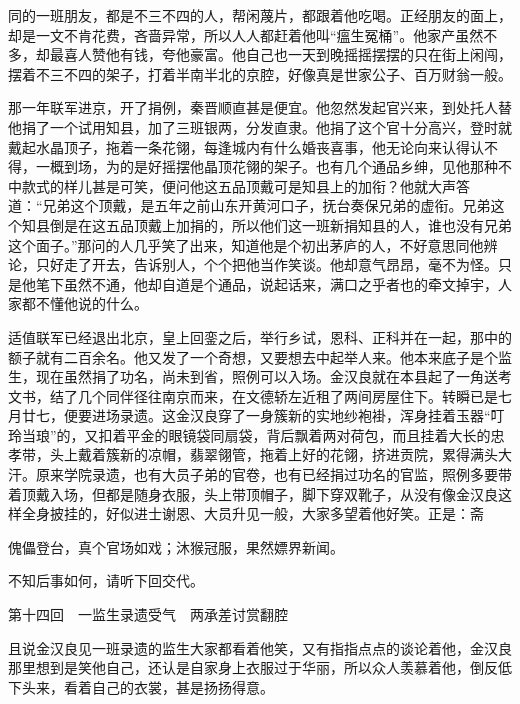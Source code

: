 \documentclass[12pt,UTF8]{ctexbook}
\begin{document}
{{{同的一班朋友，都是不三不四的人，帮闲蔑片，都跟着他吃喝。正经朋友的面上，却是一文不肯花费，吝啬异常，所以人人都赶着他叫“瘟生冤桶”。他家产虽然不多，却最喜人赞他有钱，夸他豪富。他自己也一天到晚摇摇摆摆的只在街上闲闯，摆着不三不四的架子，打着半南半北的京腔，好像真是世家公子、百万财翁一般。

那一年联军进京，开了捐例，秦晋顺直甚是便宜。他忽然发起官兴来，到处托人替他捐了一个试用知县，加了三班银两，分发直隶。他捐了这个官十分高兴，登时就戴起水晶顶子，拖着一条花翎，每逢城内有什么婚丧喜事，他无论向来认得认不得，一概到场，为的是好摇摆他晶顶花翎的架子。也有几个通品乡绅，见他那种不中款式的样儿甚是可笑，便问他这五品顶戴可是知县上的加衔？他就大声答道：“兄弟这个顶戴，是五年之前山东开黄河口子，抚台奏保兄弟的虚衔。兄弟这个知县倒是在这五品顶戴上加捐的，所以他们这一班新捐知县的人，谁也没有兄弟这个面子。”那问的人几乎笑了出来，知道他是个初出茅庐的人，不好意思同他辨论，只好走了开去，告诉别人，个个把他当作笑谈。他却意气昂昂，毫不为怪。只是他笔下虽然不通，他却自道是个通品，说起话来，满口之乎者也的牵文掉宇，人家都不懂他说的什么。

适值联军已经退出北京，皇上回銮之后，举行乡试，恩科、正科并在一起，那中的额子就有二百余名。他又发了一个奇想，又要想去中起举人来。他本来底子是个监生，现在虽然捐了功名，尚未到省，照例可以入场。金汉良就在本县起了一角送考文书，结了几个同伴径往南京而来，在文德轿左近租了两间房屋住下。转瞬已是七月廿七，便要进场录遗。这金汉良穿了一身簇新的实地纱袍褂，浑身挂着玉器“叮玲当琅”的，又扣着平金的眼镜袋同扇袋，背后飘着两对荷包，而且挂着大长的忠孝带，头上戴着簇新的凉帽，翡翠翎管，拖着上好的花翎，挤进贡院，累得满头大汗。原来学院录遗，也有大员子弟的官卷，也有已经捐过功名的官监，照例多要带着顶戴入场，但都是随身衣服，头上带顶帽子，脚下穿双靴子，从没有像金汉良这样全身披挂的，好似进士谢恩、大员升见一般，大家多望着他好笑。正是：斋

傀儡登台，真个官场如戏；沐猴冠服，果然嫖界新闻。

不知后事如何，请听下回交代。





第十四回　一监生录遗受气　两承差讨赏翻腔





且说金汉良见一班录遗的监生大家都看着他笑，又有指指点点的谈论着他，金汉良那里想到是笑他自己，还认是自家身上衣服过于华丽，所以众人羡慕着他，倒反低下头来，看着自己的衣裳，甚是扬扬得意。

}}}
\end{document}
